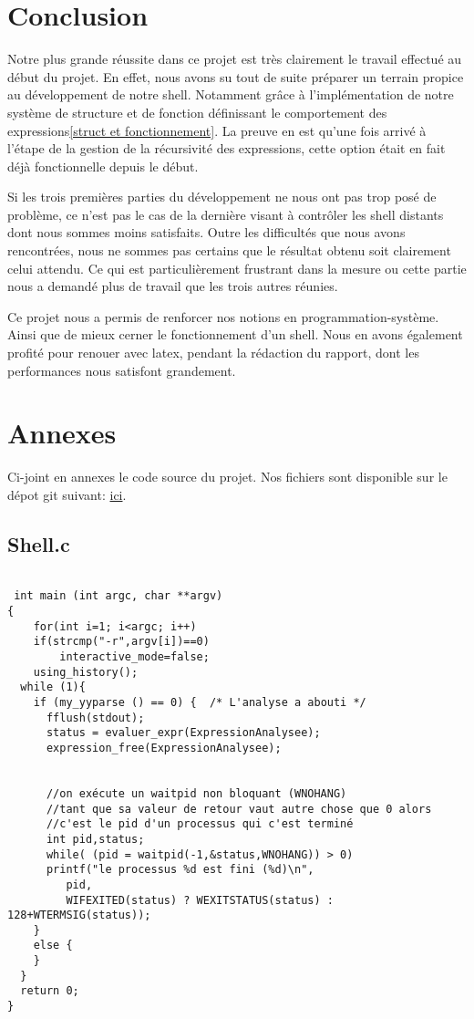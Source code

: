 \documentclass[12pt]{article}
\begin{document}
\newpage
\section{Conclusion}

Notre plus grande réussite dans ce projet est très clairement le travail effectué au
début du projet. En effet, nous avons su tout de suite préparer un terrain propice au
développement de notre shell. Notamment grâce à l'implémentation de notre système de structure et 
de fonction définissant le comportement des expressions\ref{struct et fonctionnement}.
La preuve en est qu'une fois arrivé à l'étape de la gestion de la récursivité des expressions, 
cette option était en fait déjà fonctionnelle depuis le début.\newline

Si les trois premières parties du développement ne nous ont pas trop posé de problème, ce n'est
pas le cas de la dernière visant à contrôler les shell distants dont nous sommes moins satisfaits.
Outre les difficultés que nous avons rencontrées, nous ne sommes pas certains que le résultat obtenu
soit clairement celui attendu. Ce qui est particulièrement frustrant dans la mesure ou cette partie
nous a demandé plus de travail que les trois autres réunies.\newline

Ce projet nous a permis de renforcer nos notions en programmation-système. Ainsi que de mieux
cerner le fonctionnement d'un shell. Nous en avons également profité pour renouer avec latex,
pendant la rédaction du rapport, dont les performances nous satisfont grandement.


\newpage
\section{Annexes}

Ci-joint en annexes le code source du projet. Nos fichiers sont disponible sur le dépot git suivant:
 \href{https://github.com/beziarum/shell.git}{ici}.

 \scriptsize
\subsection{Shell.c}
\label{main}
\begin{verbatim}

 int main (int argc, char **argv)
{
    for(int i=1; i<argc; i++)
	if(strcmp("-r",argv[i])==0)
	    interactive_mode=false;
    using_history();
  while (1){
    if (my_yyparse () == 0) {  /* L'analyse a abouti */
      fflush(stdout);
      status = evaluer_expr(ExpressionAnalysee);
      expression_free(ExpressionAnalysee);


      //on exécute un waitpid non bloquant (WNOHANG)
      //tant que sa valeur de retour vaut autre chose que 0 alors
      //c'est le pid d'un processus qui c'est terminé
      int pid,status;
      while( (pid = waitpid(-1,&status,WNOHANG)) > 0)
	  printf("le processus %d est fini (%d)\n",
		 pid,
		 WIFEXITED(status) ? WEXITSTATUS(status) : 128+WTERMSIG(status));
    }
    else {
    }
  }
  return 0;
}
\end{verbatim}
\end{document}
